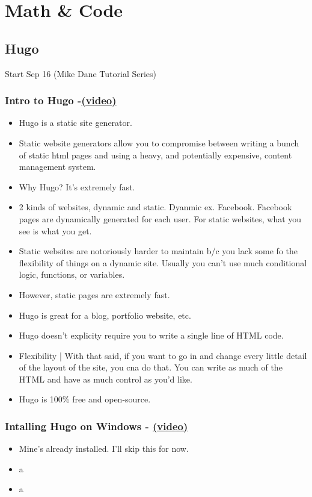 \chapter{Math \& Code}


\section{Hugo}

Start Sep 16 (Mike Dane Tutorial Series)

\subsection{Intro to Hugo -\href{https://youtu.be/qtIqKaDlqXo}{(video)} }
\begin{itemize}
	\item
	Hugo is a static site generator.
	\item
	Static website generators allow you to compromise between writing a bunch of static html pages and using a heavy, and potentially expensive, content management system.
	\item
	Why Hugo? It's extremely fast.
	\item
	2 kinds of websites, dynamic and static. Dyanmic ex. Facebook. Facebook pages are dynamically generated for each user. For static websites, what you see is what you get.
	\item
	Static websites are notoriously harder to maintain b/c you lack some fo the flexibility of things  on a dynamic site. Usually you can't use much conditional logic, functions, or variables.
	\item
	However, static pages are extremely fast.
	\item
	Hugo is great for a blog, portfolio website, etc.
	\item
	Hugo doesn't explicity require you to write a single line of HTML code.
	\item
	Flexibility | With that said, if you want to go in and change every little detail of the layout of the site, you cna do that. You can write as much of the HTML and have as much control as you'd like.
	\item
	Hugo is 100\% free and open-source.
\end{itemize}

\subsection{Intalling Hugo on Windows - \href{https://youtu.be/G7umPCU-8xc?list=PLLAZ4kZ9dFpOnyRlyS-liKL5ReHDcj4G3}{(video)} }
\begin{itemize}
	\item
	Mine's already installed. I'll skip this for now.
	\item
	a
	\item
	a
\end{itemize}


